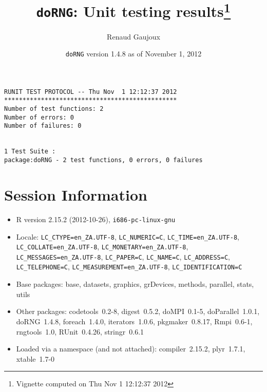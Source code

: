 \documentclass[10pt]{article}
\author{Renaud Gaujoux}
\title{\texttt{doRNG}: Unit testing results\footnote{Vignette computed  on Thu Nov  1 12:12:37 2012}}
\date{\texttt{doRNG} version 1.4.8 as of November  1, 2012}
\begin{document}
\maketitle

\begin{verbatim}
RUNIT TEST PROTOCOL -- Thu Nov  1 12:12:37 2012 
*********************************************** 
Number of test functions: 2 
Number of errors: 0 
Number of failures: 0 

 
1 Test Suite : 
package:doRNG - 2 test functions, 0 errors, 0 failures
\end{verbatim}

\section*{Session Information}
\begin{itemize}\raggedright
  \item R version 2.15.2 (2012-10-26), \verb|i686-pc-linux-gnu|
  \item Locale: \verb|LC_CTYPE=en_ZA.UTF-8|, \verb|LC_NUMERIC=C|, \verb|LC_TIME=en_ZA.UTF-8|, \verb|LC_COLLATE=en_ZA.UTF-8|, \verb|LC_MONETARY=en_ZA.UTF-8|, \verb|LC_MESSAGES=en_ZA.UTF-8|, \verb|LC_PAPER=C|, \verb|LC_NAME=C|, \verb|LC_ADDRESS=C|, \verb|LC_TELEPHONE=C|, \verb|LC_MEASUREMENT=en_ZA.UTF-8|, \verb|LC_IDENTIFICATION=C|
  \item Base packages: base, datasets, graphics, grDevices, methods,
    parallel, stats, utils
  \item Other packages: codetools~0.2-8, digest~0.5.2, doMPI~0.1-5,
    doParallel~1.0.1, doRNG~1.4.8, foreach~1.4.0, iterators~1.0.6,
    pkgmaker~0.8.17, Rmpi~0.6-1, rngtools~1.0, RUnit~0.4.26,
    stringr~0.6.1
  \item Loaded via a namespace (and not attached): compiler~2.15.2,
    plyr~1.7.1, xtable~1.7-0
\end{itemize}
\end{document}
